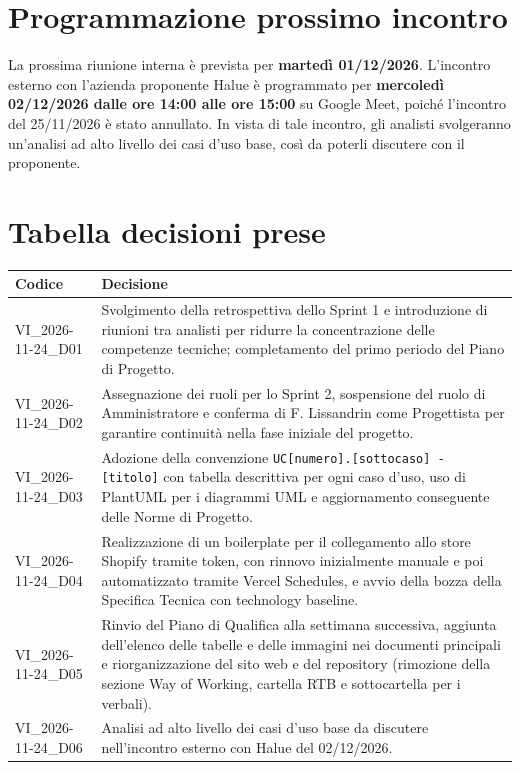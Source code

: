 \section{Programmazione prossimo incontro}
La prossima riunione interna è prevista per \textbf{martedì 01/12/2026}. L'incontro esterno con l'azienda proponente Halue è programmato per \textbf{mercoledì 02/12/2026 dalle ore 14:00 alle ore 15:00} su Google Meet, poiché l'incontro del 25/11/2026 è stato annullato. In vista di tale incontro, gli analisti svolgeranno un'analisi ad alto livello dei casi d'uso base, così da poterli discutere con il proponente.

\section{Tabella decisioni prese}
\renewcommand{\arraystretch}{1.3}
\noindent
\begin{tabularx}{\textwidth}{|l|X|}
    \hline
    \textbf{Codice} & \textbf{Decisione} \\
    \hline
    VI\_2026-11-24\_D01 & Svolgimento della retrospettiva dello Sprint 1 e introduzione di riunioni tra analisti per ridurre la concentrazione delle competenze tecniche; completamento del primo periodo del Piano di Progetto. \\
    \hline
    VI\_2026-11-24\_D02 & Assegnazione dei ruoli per lo Sprint 2, sospensione del ruolo di Amministratore e conferma di F. Lissandrin come Progettista per garantire continuità nella fase iniziale del progetto. \\
    \hline
    VI\_2026-11-24\_D03 & Adozione della convenzione \texttt{UC[numero].[sottocaso] - [titolo]} con tabella descrittiva per ogni caso d'uso, uso di PlantUML per i diagrammi UML e aggiornamento conseguente delle Norme di Progetto. \\
    \hline
    VI\_2026-11-24\_D04 & Realizzazione di un boilerplate per il collegamento allo store Shopify tramite token, con rinnovo inizialmente manuale e poi automatizzato tramite Vercel Schedules, e avvio della bozza della Specifica Tecnica con technology baseline. \\
    \hline
    VI\_2026-11-24\_D05 & Rinvio del Piano di Qualifica alla settimana successiva, aggiunta dell'elenco delle tabelle e delle immagini nei documenti principali e riorganizzazione del sito web e del repository (rimozione della sezione Way of Working, cartella RTB e sottocartella per i verbali). \\
    \hline
    VI\_2026-11-24\_D06 & Analisi ad alto livello dei casi d'uso base da discutere nell'incontro esterno con Halue del 02/12/2026. \\
    \hline
\end{tabularx}
